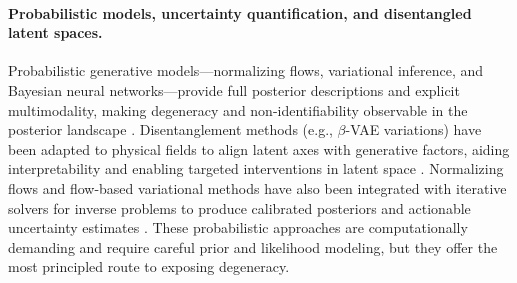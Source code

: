\documentclass[letterpaper, 12, one column]{article}
\begin{document}
\paragraph{Probabilistic models, uncertainty quantification, and disentangled latent spaces.}
Probabilistic generative models—normalizing flows, variational inference, and Bayesian neural networks—provide full posterior descriptions and explicit multimodality, making degeneracy and non-identifiability observable in the posterior landscape \cite{Wei2022}. Disentanglement methods (e.g., $\beta$-VAE variations) have been adapted to physical fields to align latent axes with generative factors, aiding interpretability and enabling targeted interventions in latent space \cite{Jacobsen2022}. Normalizing flows and flow-based variational methods have also been integrated with iterative solvers for inverse problems to produce calibrated posteriors and actionable uncertainty estimates \cite{Wei2022}. These probabilistic approaches are computationally demanding and require careful prior and likelihood modeling, but they offer the most principled route to exposing degeneracy.
\end{document}
